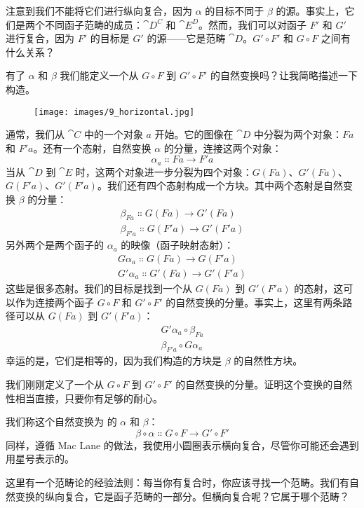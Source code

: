 \noindent
注意到我们不能将它们进行纵向复合，因为 $\alpha$ 的目标不同于 $\beta$ 的源。事实上，它们是两个不同函子范畴的成员：$\cat{D^C}$ 和 $\cat{E^D}$。然而，我们可以对函子 $F'$ 和 $G'$ 进行复合，因为 $F'$ 的目标是 $G'$ 的源——它是范畴 $\cat{D}$。$G' \circ F'$ 和 $G \circ F$ 之间有什么关系？

有了 $\alpha$ 和 $\beta$ 我们能定义一个从 $G \circ F$ 到 $G' \circ F'$ 的自然变换吗？让我简略描述一下构造。

\begin{figure}[H]
  \centering
  \texttt{[image: images/9\_horizontal.jpg]}
\end{figure}

\noindent
通常，我们从 $\cat{C}$ 中的一个对象 $a$ 开始。它的图像在 $\cat{D}$ 中分裂为两个对象：$F a$ 和 $F'a$。还有一个态射，自然变换 $\alpha$ 的分量，连接这两个对象：
\[\alpha_a \Colon F a \to F'a\]
当从 $\cat{D}$ 到 $\cat{E}$ 时，这两个对象进一步分裂为四个对象：$G (F a)$、$G'(F a)$、$G (F'a)$、$G'(F'a)$。我们还有四个态射构成一个方块。其中两个态射是自然变换 $\beta$ 的分量：
\begin{gather*}
  \beta_{F a} \Colon G (F a) \to G'(F a) \\
  \beta_{F'a} \Colon G (F'a) \to G'(F'a)
\end{gather*}
另外两个是两个函子的 $\alpha_a$ 的映像（函子映射态射）：
\begin{gather*}
  G \alpha_a \Colon G (F a) \to G (F'a) \\
  G'\alpha_a \Colon G'(F a) \to G'(F'a)
\end{gather*}
这些是很多态射。我们的目标是找到一个从 $G (F a)$ 到 $G'(F'a)$ 的态射，这可以作为连接两个函子 $G \circ F$ 和 $G' \circ F'$ 的自然变换的分量。事实上，这里有两条路径可以从 $G (F a)$ 到 $G'(F'a)$：
\begin{gather*}
  G'\alpha_a \circ \beta_{F a} \\
  \beta_{F'a} \circ G \alpha_a
\end{gather*}
幸运的是，它们是相等的，因为我们构造的方块是 $\beta$ 的自然性方块。

我们刚刚定义了一个从 $G \circ F$ 到 $G' \circ F'$ 的自然变换的分量。证明这个变换的自然性相当直接，只要你有足够的耐心。

我们称这个自然变换为  的 $\alpha$ 和 $\beta$：
\[\beta \circ \alpha \Colon G \circ F \to G' \circ F'\]
同样，遵循 Mac Lane 的做法，我使用小圆圈表示横向复合，尽管你可能还会遇到用星号表示的。

这里有一个范畴论的经验法则：每当你有复合时，你应该寻找一个范畴。我们有自然变换的纵向复合，它是函子范畴的一部分。但横向复合呢？它属于哪个范畴？

